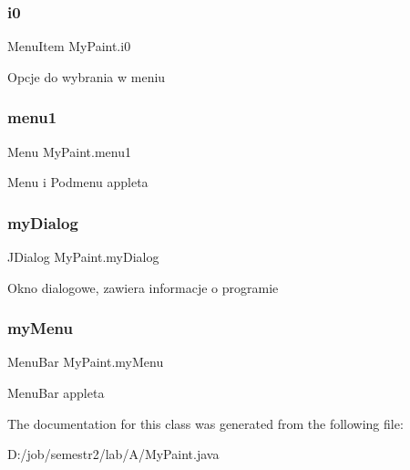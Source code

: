 \subsubsection{\texorpdfstring{i0}{i0}}
{\footnotesize\ttfamily Menu\+Item My\+Paint.\+i0\hspace{0.3cm}{\ttfamily [private]}}

Opcje do wybrania w meniu \mbox{\label{class_my_paint_a9544a7124c7b807531283b3226175b59}} 
\subsubsection{\texorpdfstring{menu1}{menu1}}
{\footnotesize\ttfamily Menu My\+Paint.\+menu1\hspace{0.3cm}{\ttfamily [private]}}

Menu i Podmenu appleta \mbox{\label{class_my_paint_a117ac196604e9160d5d572d97744e528}} 
\subsubsection{\texorpdfstring{my\+Dialog}{myDialog}}
{\footnotesize\ttfamily J\+Dialog My\+Paint.\+my\+Dialog\hspace{0.3cm}{\ttfamily [private]}}

Okno dialogowe, zawiera informacje o programie \mbox{\label{class_my_paint_a0484d7171ca748f1b39619fac6b97c29}} 
\subsubsection{\texorpdfstring{my\+Menu}{myMenu}}
{\footnotesize\ttfamily Menu\+Bar My\+Paint.\+my\+Menu\hspace{0.3cm}{\ttfamily [private]}}

Menu\+Bar appleta 

The documentation for this class was generated from the following file\+:\begin{DoxyCompactItemize}
\item 
D\+:/job/semestr2/lab/\+A/My\+Paint.\+java\end{DoxyCompactItemize}

